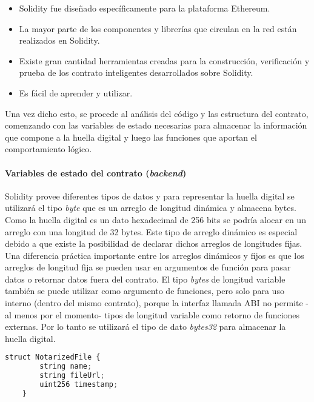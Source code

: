 \begin{itemize}
  \item Solidity fue diseñado específicamente para la plataforma Ethereum.
  \item La mayor parte de los componentes y librerías que circulan en la red están realizados en Solidity.
  \item Existe gran cantidad herramientas creadas para la construcción, verificación y prueba de los contrato inteligentes desarrollados sobre Solidity.
  \item Es fácil de aprender y utilizar.
\end{itemize}

Una vez dicho esto, se procede al análisis del código y las estructura del contrato, comenzando con las variables de estado necesarias para almacenar la información que compone a la huella digital y luego las funciones que aportan el comportamiento lógico.

\paragraph{Variables de estado del contrato (\textit{backend})}

Solidity provee diferentes tipos de datos y para representar la huella digital se utilizará el tipo \textit{byte} que es un arreglo de longitud dinámica y almacena bytes. Como la huella digital es un dato hexadecimal de 256 bits se podría alocar en un arreglo con una longitud de 32 bytes. Este tipo de arreglo dinámico es especial debido a que existe la posibilidad de declarar dichos arreglos de longitudes fijas. Una diferencia práctica importante entre los arreglos dinámicos y fijos es que los arreglos de longitud fija se pueden usar en argumentos de función para pasar datos o retornar datos fuera del contrato. El tipo \textit{bytes} de longitud variable también se puede utilizar como argumento de funciones, pero solo para uso interno (dentro del mismo contrato), porque la interfaz llamada ABI no permite -al menos por el momento- tipos de longitud variable como retorno de funciones externas. Por lo tanto se utilizará el tipo de dato \textit{bytes32} para almacenar la huella digital.

\begin{minipage}{\linewidth}
  \begin{lstlisting}[frame=single, language=javascript, captionpos=b, caption=Tipo de dato NotarizedFile, belowskip=1em, aboveskip=2em, label={lst:post_archivo}]
    struct NotarizedFile {
        string name;
        string fileUrl;
        uint256 timestamp;
    }
  \end{lstlisting}
\end{minipage}

